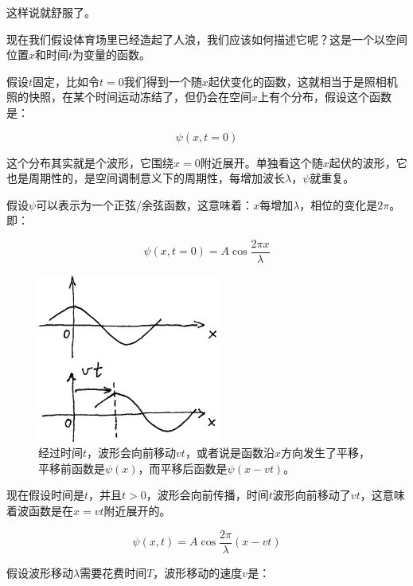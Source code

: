 这样说就舒服了。

现在我们假设体育场里已经造起了人浪，我们应该如何描述它呢？这是一个以空间位置$x$和时间$t$为变量的函数。

假设$t$固定，比如令$t = 0$我们得到一个随$x$起伏变化的函数，这就相当于是照相机照的快照，在某个时间运动冻结了，但仍会在空间$x$上有个分布，假设这个函数是：

\begin{equation*}
\psi (x, t = 0) 
\end{equation*}

这个分布其实就是个波形，它围绕$x = 0$附近展开。单独看这个随$x$起伏的波形，它也是周期性的，是空间调制意义下的周期性，每增加波长$\lambda$，$\psi$就重复。

假设$\psi$可以表示为一个正弦/余弦函数，这意味着：$x$每增加$\lambda$，相位的变化是$2 \pi$。即：

\begin{equation*}
\psi (x, t = 0) = A \cos \frac{2 \pi x}{ \lambda}
\end{equation*}

\begin{figure}[htbp]
\begin{center}
\includegraphics[width=6cm]{Preface/waveaftervt.png}
\caption{经过时间$t$，波形会向前移动$vt$，或者说是函数沿$x$方向发生了平移，平移前函数是$\psi(x)$，而平移后函数是$\psi(x - vt)$。}
\end{center}
\end{figure}



现在假设时间是$t$，并且$t > 0$，波形会向前传播，时间$t$波形向前移动了$vt$，这意味着波函数是在$x = vt$附近展开的。

\begin{equation*}
\psi(x,t) = A \cos \frac{2 \pi}{\lambda} \left( x - vt \right)
\end{equation*}

假设波形移动$\lambda$需要花费时间$T$，波形移动的速度$v$是：

